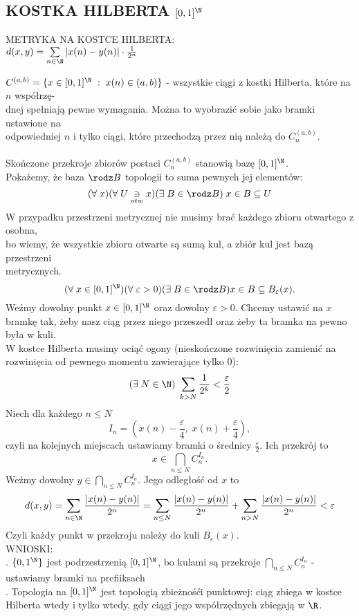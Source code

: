 \subsection{KOSTKA HILBERTA $[0,1]^\N$}
\begin{center}\large
    {\color{def}METRYKA NA KOSTCE HILBERTA:}\smallskip\\
    $d(x,y)=\sum\limits_{n\in\N}|x(n)-y(n)|\cdot\frac1{2^n}$
\end{center}\bigskip
$C^{(a,b)}=\{x\in[0,1]^\N\;:\;x(n)\in (a,b)\}$ - wszystkie ciągi z kostki Hilberta, które na $n$ współrzę-\\dnej spełniają pewne wymagania. Można to wyobrazić sobie jako bramki ustawione na \\odpowiedniej $n$ i tylko ciągi, które przechodzą przez nią należą do $C^{(a, b)}_n$.\bigskip\\
\bigskip\\
{\large Skończone przekroje zbiorów postaci $C_n^{(a,b)}$ stanowią bazę $[0,1]^\N$}.\bigskip\\
\dowod
Pokażemy, że baza $\rodz B$ topologii to suma pewnych jej elementów:
$$(\forall\;x)(\forall \;U\underset{otw}\ni x)(\exists\;B\in\rodz B)\;x\in B\subseteq U$$
W przypadku przestrzeni metrycznej nie musimy brać każdego zbioru otwartego z osobna, \\bo wiemy, że wszystkie zbioru otwarte są sumą kul, a zbiór kul jest bazą przestrzeni \\metrycznych.
$$(\forall\;x\in[0,1]^\N)(\forall\;\varepsilon>0)(\exists\;B\in\rodz B)x\in B\subseteq B_\varepsilon (x).$$
Weźmy dowolny punkt $x\in[0, 1]^\N$ oraz dowolny $\varepsilon>0$. Chcemy ustawić na $x$ bramkę tak, żeby nasz ciąg przez niego przeszedł oraz żeby ta bramka na pewno była w kuli.\medskip\\
W kostce Hilberta musimy ociąć ogony (nieskończone rozwinięcia zamienić na rozwinięcia od pewnego momentu zawierające tylko 0):
$$(\exists\;N\in \N)\;\sum\limits_{k>N}\frac1{2^k}<\frac\varepsilon2$$
Niech dla każdego $n\leq N$
$$I_n=(x(n)-\frac\varepsilon4,\; x(n)+\frac\varepsilon4),$$
czyli na kolejnych miejscach ustawiamy bramki o średnicy $\frac\varepsilon2$. Ich przekrój to
$$x\in\bigcap\limits_{n\leq N}C^{I_n}_n.$$
Weźmy dowolny $y\in \bigcap\limits_{n\leq N}C^{I_n}_n$. Jego odległość od $x$ to
$$d(x, y)=\sum\limits_{n\in\N}{|x(n)-y(n)|\over 2^n}=\sum\limits_{n\leq N}{|x(n)-y(n)|\over 2^n}+\sum\limits_{n>N}{|x(n)-y(n)|\over 2^n}<\varepsilon$$
Czyli każdy punkt w przekroju należy do kuli $B_\varepsilon(x)$.
\kondow
{}\bigskip\\
{\color{def}WNIOSKI:}\medskip\\
    . $\{0,1^\N\}$ jest podrzestrzenią $[0,1]^\N$, bo kulami są przekroje $\bigcap\limits_{n\leq N}C_n^{I_n}$ - ustawiamy bramki na prefiiksach\medskip\\
    . Topologia na $[0, 1]^\N$ jest topologią zbieżnośći punktowej: ciąg zbiega w kostce \\Hilberta wtedy i tylko wtedy, gdy ciągi jego współrzędnych zbiegają w $\R$.